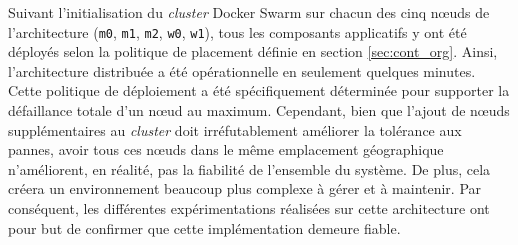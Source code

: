 Suivant l'initialisation du \textit{cluster} Docker Swarm sur chacun des cinq n\oe{}uds de l'architecture (\texttt{m0}, \texttt{m1}, \texttt{m2}, \texttt{w0}, \texttt{w1}), tous les composants applicatifs y ont été déployés selon la politique de placement définie en section \ref{sec:cont_org}. Ainsi, l'architecture distribuée a été opérationnelle en seulement quelques minutes. Cette politique de déploiement a été spécifiquement déterminée pour supporter la défaillance totale d'un n\oe{}ud au maximum. Cependant, bien que l'ajout de n\oe{}uds supplémentaires au \textit{cluster} doit irréfutablement améliorer la tolérance aux pannes, avoir tous ces n\oe{}uds dans le même emplacement géographique n'améliorent, en réalité, pas la fiabilité de l'ensemble du système. De plus, cela créera un environnement beaucoup plus complexe à gérer et à maintenir. Par conséquent, les différentes expérimentations réalisées sur cette architecture ont pour but de confirmer que cette implémentation demeure fiable.

